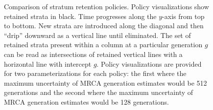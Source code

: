 \begin{figure}
\begin{tabular}{m{}@{}|c@{}|c@{\hskip 0.01\textwidth}|m{}}
  \end{tabular}
  \caption{
  Comparison of stratum retention policies.
  Policy visualizations show retained strata in black.
  Time progresses along the $y$-axis from top to bottom.
  New strata are introduced along the diagonal and then ``drip'' downward as a vertical line until eliminated.
  The set of retained strata present within a column at a particular generation $g$ can be read as intersections of retained vertical lines with a horizontal line with intercept $g$.
  Policy visualizations are provided for two parameterizations for each policy: the first where the maximum uncertainty of MRCA generation estimates would be 512 generations and the second where the maximum uncertainty of MRCA generation estimates would be 128 generations.
  }
  \label{fig:retention-policies}
\end{figure}
